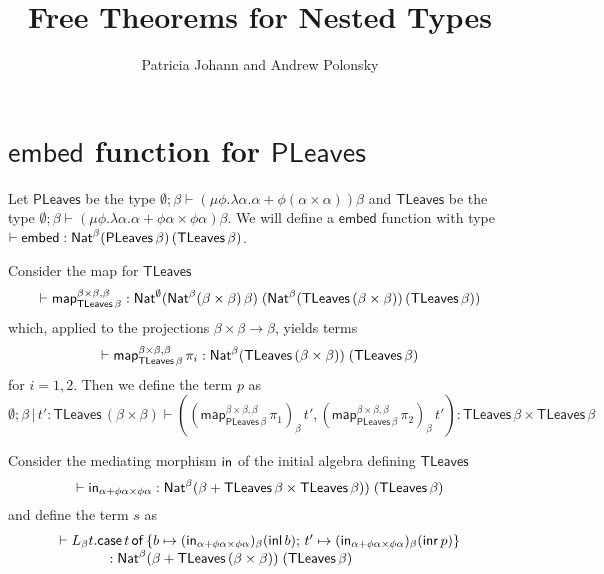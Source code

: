 \documentclass[acmsmall,review,anonymous]{acmart}
\title[Free Theorems for Nested Types]{Free Theorems for 
Nested Types} %
\author{Patricia Johann and Andrew Polonsky}
\affiliation{
  \institution{Appalachian State University}            %
}
\theoremstyle{definition}
\newcommand{\map}{\mathsf{map}}
\begin{document}
\newcommand{\tb}[1]{~~ \mbox{#1} ~~}
\newcommand{\listt}[1]{(\mu \phi. \lambda \beta . \onet + \beta \times \phi \beta) #1}
\newcommand{\filtype}{\Nat^\emptyset 
  \, (\Nat^\emptyset \, \alpha \, \mathit{Bool}) (\Nat^\emptyset \, (\GRose\, \psi\, \alpha) \, (\GRose\, \psi\, (\alpha + \onet)))}
\newcommand{\maplist}{\map_{\lambda A. \setsem{\emptyset; \alpha \vdash List \, \alpha} \rho[\alpha := A]}}

\newcommand{\PLeaves}{\mathsf{PLeaves}}
\newcommand{\TLeaves}{\mathsf{TLeaves}}
\newcommand{\TLsplit}{\mathsf{TLsplit}}
\newcommand{\PLsplit}{\mathsf{split}}
\newcommand{\PLembed}{\mathsf{embed}}

\maketitle

\section{$\PLembed$ function for $\PLeaves$}

Let $\PLeaves$ be the type $\emptyset; \beta \vdash (\mu \phi. \lambda \alpha. \alpha + \phi(\alpha \times \alpha))\beta$
and $\TLeaves$ be the type $\emptyset; \beta \vdash (\mu \phi. \lambda \alpha. \alpha + \phi \alpha \times \phi \alpha)\beta$.
We will define a $\PLembed$ function with type $\vdash \PLembed : \Nat^{\beta} (\PLeaves\,\beta)\,(\TLeaves\,\beta)$.

Consider the map for $\TLeaves$
\[
	\vdash \map_{\TLeaves\,\beta}^{\beta \times \beta, \beta}
	: \Nat^{\emptyset}
	(\Nat^{\beta} (\beta \times \beta)\, \beta)\;
	(\Nat^{\beta} (\TLeaves\,(\beta \times \beta))\, (\TLeaves\,\beta))
\]
which, applied to the projections $\beta \times \beta \to \beta$, yields terms
\[
	\vdash \map_{\TLeaves\,\beta}^{\beta \times \beta, \beta}\, \pi_i
	: \Nat^{\beta} (\TLeaves\,(\beta \times \beta))\; (\TLeaves\, \beta)
\]
for $i = 1, 2$.
Then we define the term $p$ as
\[
\emptyset; \beta \,|\, t' : \TLeaves\,(\beta \times \beta)
\vdash ((\map_{\PLeaves\,\beta}^{\beta \times \beta, \beta}\, \pi_1)_{\beta}\, t', (\map_{\PLeaves\,\beta}^{\beta \times \beta, \beta}\, \pi_2)_{\beta}\, t')
: \TLeaves\,\beta \times \TLeaves\,\beta
\]

Consider the mediating morphism $\mathsf{in}$ of the initial algebra defining $\TLeaves$
\[
	\vdash \tin_{\alpha + \phi \alpha \times \phi \alpha}
	: \Nat^{\beta} (\beta + \TLeaves\,\beta \times \TLeaves\,\beta)) \; (\TLeaves\, \beta)
\]
and define the term $s$ as
\[
\begin{array}{l}
	\vdash L_{\beta} t. \case{t}{b \mapsto (\tin_{\alpha + \phi\alpha \times \phi\alpha})_{\beta} (\inl\, b)}
	{t' \mapsto (\tin_{\alpha + \phi \alpha \times \phi \alpha})_{\beta} (\inr\, p)} \\
	\hspace*{0.5in} : \Nat^{\beta} (\beta + \TLeaves\,(\beta \times \beta))\; (\TLeaves\,\beta)
\end{array}
\]
\end{document}
